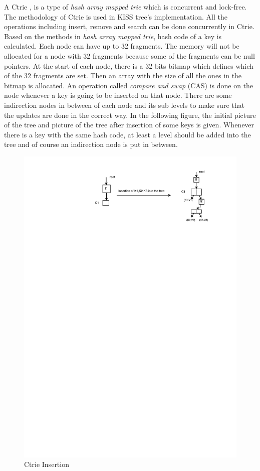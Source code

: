 \documentclass{report}
\begin{document}
A Ctrie \cite{calfcht,ctenbs}, is a type of \textit{hash array mapped trie} \cite{hamt} which is concurrent and lock-free. The methodology of Ctrie is used in KISS tree's  \cite{Kissinger} implementation. All the operations including insert, remove and search can be done concurrently in Ctrie. Based on the methods in \textit{hash array mapped trie}, hash code of a key is calculated. Each node can have up to 32 fragments. The memory will not be allocated for a node with 32 fragments because some of the fragments can be null pointers. At the start of each node, there is a 32 bits bitmap which defines which of the 32 fragments are set. Then an array with the size of all the ones in the bitmap is allocated. An operation called \textit{compare and swap} (CAS) is done on the node whenever a key is going to be inserted on that node. There are some indirection nodes in between of each node and its sub levels to make sure that the updates are done in the correct way. In the following figure, the initial picture of the tree and picture of the tree after insertion of some keys is given. Whenever there is a key with the same hash code, at least a level should be added into the tree and of course an indirection node is put in between.

\begin{figure}[h]
\includegraphics[scale=0.6]{ctrie}
\caption{ Ctrie Insertion}
\centering
\end{figure} 
\end{document}
